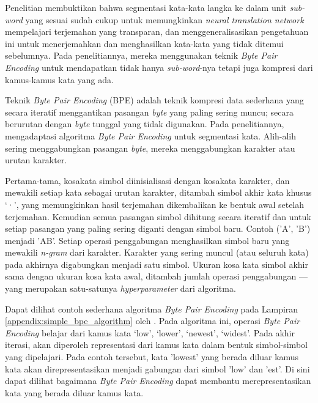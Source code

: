    Penelitian \parencite{Sennrich_Haddow_Birch_2016} membuktikan bahwa segmentasi kata-kata langka ke dalam unit \textit{sub-word} yang sesuai sudah cukup untuk memungkinkan \textit{neural translation network} mempelajari terjemahan yang transparan, dan menggeneralisasikan pengetahuan ini untuk menerjemahkan dan menghasilkan kata-kata yang tidak ditemui sebelumnya. Pada penelitiannya, mereka menggunakan teknik \textit{Byte Pair Encoding} untuk mendapatkan tidak hanya \textit{sub-word}-nya tetapi juga kompresi dari kamus-kamus kata yang ada.

    Teknik \textit{Byte Pair Encoding} (BPE) \parencite{GageBPE1994} adalah teknik kompresi data sederhana yang secara iteratif menggantikan pasangan \textit{byte} yang paling sering muncu; secara berurutan dengan \textit{byte} tunggal yang tidak digunakan. Pada penelitiannya, \parencite{Sennrich_Haddow_Birch_2016} mengadaptasi algoritma \textit{Byte Pair Encoding} untuk segmentasi kata. Alih-alih sering menggabungkan pasangan \textit{byte}, mereka menggabungkan karakter atau urutan karakter.

    Pertama-tama, kosakata simbol diinisialisasi dengan kosakata karakter, dan mewakili setiap kata sebagai urutan karakter, ditambah simbol akhir kata khusus ‘·’, yang memungkinkan hasil terjemahan dikembalikan ke bentuk awal setelah terjemahan. Kemudian semua pasangan simbol dihitung secara iteratif dan untuk setiap pasangan yang paling sering diganti dengan simbol baru. Contoh ('A', 'B') menjadi 'AB'. Setiap operasi penggabungan menghasilkan simbol baru yang mewakili \textit{n-gram} dari karakter. Karakter yang sering muncul (atau seluruh kata) pada akhirnya digabungkan menjadi satu simbol. Ukuran kosa kata simbol akhir sama dengan ukuran kosa kata awal, ditambah jumlah operasi penggabungan --- yang merupakan satu-satunya \textit{hyperparameter} dari algoritma.

    Dapat dilihat contoh sederhana algoritma \textit{Byte Pair Encoding} pada Lampiran \ref{appendix:simple_bpe_algorithm} oleh \parencite{Sennrich_Haddow_Birch_2016}. Pada algoritma ini, operasi \textit{Byte Pair Encoding} belajar dari kamus kata {‘low’, ‘lower’, ‘newest’, ‘widest’}. Pada akhir iterasi, akan diperoleh representasi dari kamus kata dalam bentuk simbol-simbol yang dipelajari. Pada contoh tersebut, kata 'lowest' yang berada diluar kamus kata akan direpresentasikan menjadi gabungan dari simbol 'low' dan 'est'. Di sini dapat dilihat bagaimana \textit{Byte Pair Encoding} dapat membantu merepresentasikan kata yang berada diluar kamus kata. 

